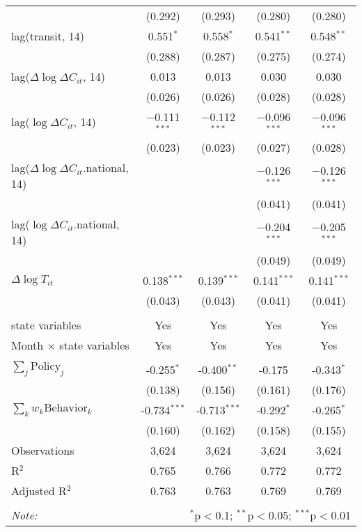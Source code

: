 \begin{tabular}{@{\extracolsep{1pt}}lcccc}
  & (0.292) & (0.293) & (0.280) & (0.280) \\ 
  lag(transit, 14) & 0.551$^{*}$ & 0.558$^{*}$ & 0.541$^{**}$ & 0.548$^{**}$ \\ 
  & (0.288) & (0.287) & (0.275) & (0.274) \\ 
  lag($\Delta \log \Delta C_{it}$, 14) & 0.013 & 0.013 & 0.030 & 0.030 \\ 
  & (0.026) & (0.026) & (0.028) & (0.028) \\ 
  lag($\log \Delta C_{it}$, 14) & $-$0.111$^{***}$ & $-$0.112$^{***}$ & $-$0.096$^{***}$ & $-$0.096$^{***}$ \\ 
  & (0.023) & (0.023) & (0.027) & (0.028) \\ 
  lag($\Delta \log \Delta C_{it}$.national, 14) &  &  & $-$0.126$^{***}$ & $-$0.126$^{***}$ \\ 
  &  &  & (0.041) & (0.041) \\ 
  lag($\log \Delta C_{it}$.national, 14) &  &  & $-$0.204$^{***}$ & $-$0.205$^{***}$ \\ 
  &  &  & (0.049) & (0.049) \\ 
  $\Delta \log T_{it}$ & 0.138$^{***}$ & 0.139$^{***}$ & 0.141$^{***}$ & 0.141$^{***}$ \\ 
  & (0.043) & (0.043) & (0.041) & (0.041) \\ 
 \hline \\[-1.8ex] 
state variables & Yes & Yes & Yes & Yes \\ 
Month $\times$ state variables & Yes & Yes & Yes & Yes \\ 
\hline \\[-1.8ex] 
$\sum_j \mathrm{Policy}_j$ & -0.255$^{*}$ & -0.400$^{**}$ & -0.175 & -0.343$^{*}$ \\ 
 & (0.138) & (0.156) & (0.161) & (0.176) \\ 
$\sum_k w_k \mathrm{Behavior}_k$ & -0.734$^{***}$ & -0.713$^{***}$ & -0.292$^{*}$ & -0.265$^{*}$ \\ 
 & (0.160) & (0.162) & (0.158) & (0.155) \\ 
Observations & 3,624 & 3,624 & 3,624 & 3,624 \\ 
R$^{2}$ & 0.765 & 0.766 & 0.772 & 0.772 \\ 
Adjusted R$^{2}$ & 0.763 & 0.763 & 0.769 & 0.769 \\ 
\hline 
\hline \\[-1.8ex] 
\textit{Note:}  & \multicolumn{4}{r}{$^{*}$p$<$0.1; $^{**}$p$<$0.05; $^{***}$p$<$0.01} \\ 
\end{tabular} 